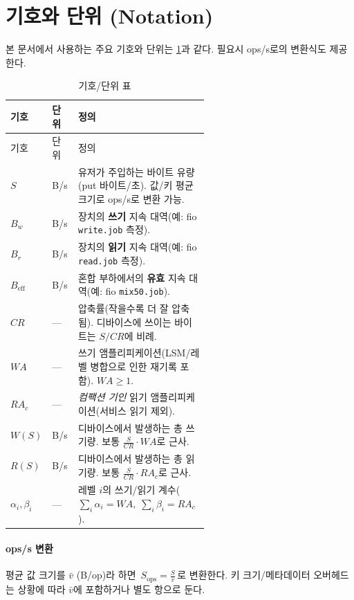 \documentclass[11pt,a4paper]{article}
\begin{document}
\section{기호와 단위 (Notation)}
본 문서에서 사용하는 주요 기호와 단위는 \cref{tab:notation}과 같다.
필요시 ops/s로의 변환식도 제공한다.

\begin{longtable}{@{}l l p{0.57\linewidth}@{}}
    \caption{기호/단위 표}\label{tab:notation}\\
    \toprule
    기호 & 단위 & 정의 \\\midrule
    \endfirsthead
    \toprule
    기호 & 단위 & 정의 \\\midrule
    \endhead
    \(S\) & \si{B/s} & 유저가 주입하는 바이트 유량(put 바이트/초). 값/키 평균 크기로 ops/s로 변환 가능. \\
    \(B_w\) & \si{B/s} & 장치의 \textbf{쓰기} 지속 대역(예: fio \texttt{write.job} 측정). \\
    \(B_r\) & \si{B/s} & 장치의 \textbf{읽기} 지속 대역(예: fio \texttt{read.job} 측정). \\
    \(B_{\text{eff}}\) & \si{B/s} & 혼합 부하에서의 \textbf{유효} 지속 대역(예: fio \texttt{mix50.job}). \\
    \(CR\) & --- & 압축률(작을수록 더 잘 압축됨). 디바이스에 쓰이는 바이트는 \(S/CR\)에 비례. \\
    \(WA\) & --- & 쓰기 앰플리피케이션(LSM/레벨 병합으로 인한 재기록 포함). \(WA\ge1\). \\
    \(RA_c\) & --- & \emph{컴팩션 기인} 읽기 앰플리피케이션(서비스 읽기 제외). \\
    \(W(S)\) & \si{B/s} & 디바이스에서 발생하는 총 쓰기량. 보통 \(\frac{S}{CR}\cdot WA\)로 근사. \\
    \(R(S)\) & \si{B/s} & 디바이스에서 발생하는 총 읽기량. 보통 \(\frac{S}{CR}\cdot RA_c\)로 근사. \\
    \(\alpha_i,\beta_i\) & --- & 레벨 \(i\)의 쓰기/읽기 계수(\(\sum_i\alpha_i{=}WA,\;\sum_i\beta_i{=}RA_c\)). \\
    \bottomrule
\end{longtable}

\paragraph{ops/s 변환} 평균 값 크기를 \(\bar v\) (\si{B/op})라 하면
\(\,S_{\text{ops}}=\frac{S}{\bar v}\,\)로 변환한다.
키 크기/메타데이터 오버헤드는 상황에 따라 \(\bar v\)에 포함하거나 별도 항으로 둔다.
\end{document}
